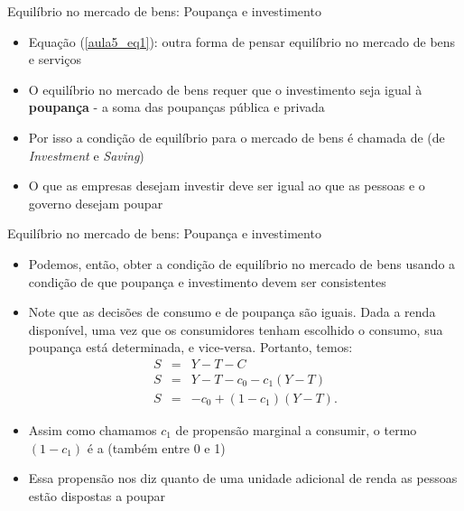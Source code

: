 \documentclass[10pt]{beamer}
\begin{document}
\begin{frame}{Equilíbrio no mercado de bens: Poupança e investimento}
    \begin{itemize}
        \item Equação (\ref{aula5_eq1}): outra forma de pensar equilíbrio no mercado de bens e serviços\bigskip

        \item O equilíbrio no mercado de bens requer que o investimento seja igual à \textbf{poupança} - a soma das poupanças pública e privada\bigskip

        \item Por isso a condição de equilíbrio para o mercado de bens é chamada de  (de \emph{Investment} e \emph{Saving})\bigskip

        \item O que as empresas desejam investir deve ser igual ao que as pessoas e o governo desejam poupar
    \end{itemize}
\end{frame}

\begin{frame}{Equilíbrio no mercado de bens: Poupança e investimento}
    \begin{itemize}
        \item Podemos, então, obter a condição de equilíbrio no mercado de bens usando a condição de que poupança e investimento devem ser consistentes\bigskip

        \item Note que as decisões de consumo e de poupança são iguais. Dada a renda disponível, uma vez que os consumidores tenham escolhido o consumo, sua poupança está determinada, e vice-versa. Portanto, temos:
              \begin{eqnarray}
                  S &=& Y - T - C \nonumber \\
                  S &=& Y - T - c_0 - c_1(Y - T) \nonumber \\
                  S &=& -c_0 + (1 - c_1)(Y - T).
              \end{eqnarray}

        \item Assim como chamamos $c_1$ de propensão marginal a consumir, o termo $(1 - c_1)$ é a  (também entre 0 e 1)\bigskip

        \item Essa propensão nos diz quanto de uma unidade adicional de renda as pessoas estão dispostas a poupar
    \end{itemize}
\end{frame}
\end{document}
